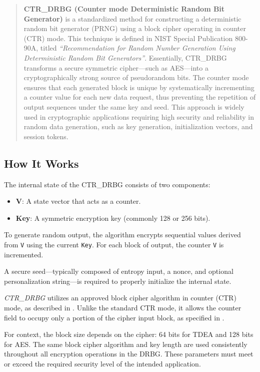 \begin{quote}
\textbf{CTR\_DRBG (Counter mode Deterministic Random Bit Generator)} is a standardized method for constructing a deterministic random bit generator (PRNG) using a block cipher operating in counter (CTR) mode. This technique is defined in NIST Special Publication 800-90A, titled \textit{``Recommendation for Random Number Generation Using Deterministic Random Bit Generators''}. Essentially, CTR\_DRBG transforms a secure symmetric cipher---such as AES---into a cryptographically strong source of pseudorandom bits. The counter mode ensures that each generated block is unique by systematically incrementing a counter value for each new data request, thus preventing the repetition of output sequences under the same key and seed. This approach is widely used in cryptographic applications requiring high security and reliability in random data generation, such as key generation, initialization vectors, and session tokens.
\end{quote}

\subsection*{How It Works}

The internal state of the CTR\_DRBG consists of two components:

\begin{itemize}
    \item \textnormal{\textbf{V}}: A state vector that acts as a counter.
    \item \textnormal{\textbf{Key}}: A symmetric encryption key (commonly 128 or 256 bits).
\end{itemize}

To generate random output, the algorithm encrypts sequential values derived from \texttt{V} using the current \texttt{Key}. For each block of output, the counter \texttt{V} is incremented. 

A secure seed—typically composed of entropy input, a nonce, and optional personalization string—is required to properly initialize the internal state.

\textit{CTR\_DRBG} utilizes an approved block cipher algorithm in counter (CTR) mode, as described in \cite{nist80090a}. Unlike the standard CTR mode, it allows the counter field to occupy only a portion of the cipher input block, as specified in \cite{nist80038d}.

For context, the block size depends on the cipher: 64 bits for TDEA and 128 bits for AES. The same block cipher algorithm and key length are used consistently throughout all encryption operations in the DRBG. These parameters must meet or exceed the required security level of the intended application.

